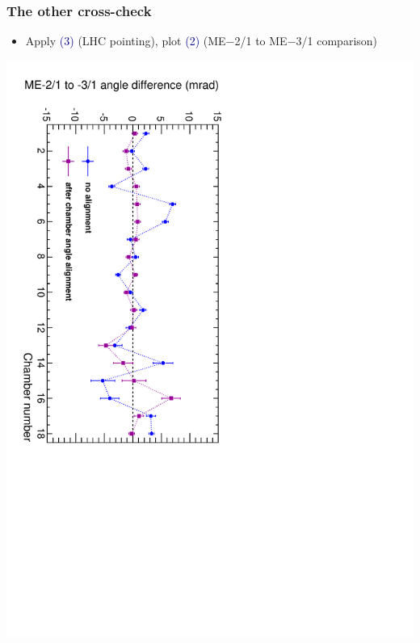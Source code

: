 \documentclass[compress]{beamer}
\begin{document}
\begin{frame}
\frametitle{The other cross-check}
\begin{itemize}
\item Apply \textcolor{darkblue}{(3)} (LHC pointing), plot \textcolor{darkblue}{(2)} (ME$-$2/1 to ME$-$3/1 comparison)
\end{itemize}
\includegraphics[height=\linewidth, angle=90]{angle_matching.pdf}
\end{frame}
\end{document}
